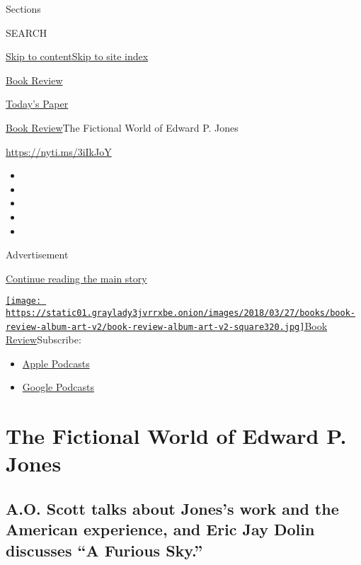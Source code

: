 Sections

SEARCH

\protect\hyperlink{site-content}{Skip to
content}\protect\hyperlink{site-index}{Skip to site index}

\href{https://www.nytimes3xbfgragh.onion/section/books/review}{Book
Review}

\href{https://myaccount.nytimes3xbfgragh.onion/auth/login?response_type=cookie\&client_id=vi}{}

\href{https://www.nytimes3xbfgragh.onion/section/todayspaper}{Today's
Paper}

\href{/section/books/review}{Book Review}\textbar{}The Fictional World
of Edward P. Jones

\url{https://nyti.ms/3iIkJoY}

\begin{itemize}
\item
\item
\item
\item
\item
\end{itemize}

Advertisement

\protect\hyperlink{after-top}{Continue reading the main story}

\href{https://www.nytimes3xbfgragh.onion/column/book-review-podcast}{\texttt{[image: https://static01.graylady3jvrrxbe.onion/images/2018/03/27/books/book-review-album-art-v2/book-review-album-art-v2-square320.jpg]}Book
Review}Subscribe:

\begin{itemize}
\tightlist
\item
  \href{https://itunes.apple.com/us/podcast/id120315179}{Apple Podcasts}
\item
  \href{https://www.google.com/podcasts?feed=aHR0cHM6Ly9yc3MuYXJ0MTkuY29tL2Jvb2stcmV2aWV3}{Google
  Podcasts}
\end{itemize}

\hypertarget{the-fictional-world-of-edward-p-jones}{%
\section{The Fictional World of Edward P.
Jones}\label{the-fictional-world-of-edward-p-jones}}

\hypertarget{ao-scott-talks-about-joness-work-and-the-american-experience-and-eric-jay-dolin-discusses-a-furious-sky}{%
\subsection{A.O. Scott talks about Jones's work and the American
experience, and Eric Jay Dolin discusses ``A Furious
Sky.''}\label{ao-scott-talks-about-joness-work-and-the-american-experience-and-eric-jay-dolin-discusses-a-furious-sky}}

